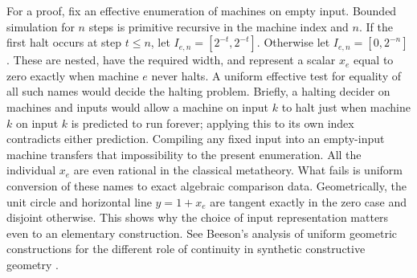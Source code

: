 For a proof, fix an effective enumeration of machines on empty input.
Bounded simulation for $n$ steps is primitive recursive in the machine
index and $n$. If the first halt occurs at step $t\le n$, let
$I_{e,n}=[2^{-t},2^{-t}]$. Otherwise let $I_{e,n}=[0,2^{-n}]$.
These are nested, have the required width, and represent a scalar
$x_e$ equal to zero exactly when machine $e$ never halts. A uniform
effective test for equality of all such names would decide the halting
problem. Briefly, a halting decider on machines and inputs would allow a
machine on input $k$ to halt just when machine $k$ on input $k$ is
predicted to run forever; applying this to its own index contradicts
either prediction. Compiling any fixed input into an empty-input
machine transfers that impossibility to the present enumeration.
All the individual $x_e$ are even rational in the classical metatheory.
What fails is uniform conversion of these names to exact algebraic comparison
data. Geometrically, the unit circle and horizontal line $y=1+x_e$ are
tangent exactly in the zero case and disjoint otherwise. This shows why
the choice of input representation matters even to an elementary
construction. See Beeson's analysis of uniform geometric constructions
for the different role of continuity in synthetic constructive geometry
\cite{beeson}.
